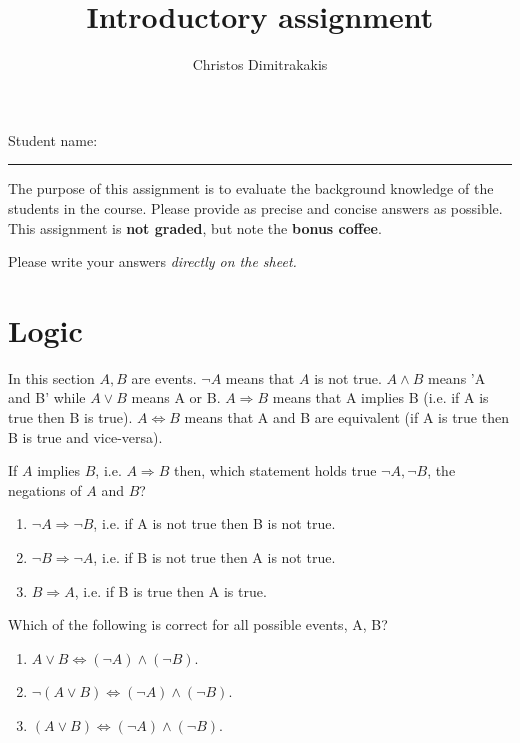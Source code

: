 \documentclass[a4paper]{article}
\title{Introductory assignment}
\author{Christos Dimitrakakis}
\begin{document}
\maketitle

{\Large Student name:}
\vspace{0.5em}
\hrule
\vspace{1em}
The purpose of this assignment is to evaluate the background knowledge
of the students in the course. Please provide as precise and concise
answers as possible. This assignment is \textbf{not graded}, but note the \textbf{bonus coffee}.

Please write your answers \emph{directly on the sheet.}

\section{Logic}
In this section $A, B$ are events. $\neg A$ means that $A$ is not true. $A \wedge B$ means 'A and B' while $A
\vee B$ means A or B. $A \Rightarrow B$ means that A implies B (i.e. if A is true then B is true).
$A \Leftrightarrow B$ means that A and B are equivalent (if A is true then B is true and vice-versa).

\begin{exercise}
  If $A$ implies $B$, i.e. $A \Rightarrow B$ then, which statement holds true $\neg A, \neg B$, the negations of $A$ and $B$?
  \begin{enumerate}
  \item $\neg A \Rightarrow \neg B$, i.e. if A is not true then B is not true.
  \item $\neg B \Rightarrow \neg A$, i.e. if B is not true then A is not true.
  \item $B \Rightarrow A$, i.e. if B is true then A is true.
  \end{enumerate}
\end{exercise}

\begin{exercise}
  Which of the following is correct for all possible events, A, B?
  \begin{enumerate}
  \item $A \vee B \Leftrightarrow  (\neg A) \wedge (\neg B)$.
  \item $\neg (A \vee B) \Leftrightarrow (\neg A) \wedge (\neg B)$.
  \item $(A \vee B) \Leftrightarrow (\neg A) \wedge (\neg B)$.
  \end{enumerate}
\end{exercise}
\end{document}
